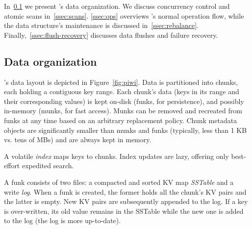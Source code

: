 

In~\cref{ssec:layout} we present \sys's data organization. 
We discuss concurrency control and atomic scans in~\cref{ssec:scans}.
\cref{ssec:ops} overviews \sys's normal %
operation flow, while   the data structure's maintenance is discussed in~\cref{ssec:rebalance}.
Finally,~\cref{ssec:flush-recovery} discusses data flushes and failure recovery.


\subsection{Data organization}
\label{ssec:layout}


\sys's data layout is depicted in Figure~\ref{fig:piwi}.
Data is partitioned into chunks, each holding a contiguous key range.
Each chunk's data 
(keys in its range and their corresponding values) 
is kept on-disk (funks, for persistence), and possibly in-memory (munks, for fast access). 
Munks can be removed and recreated from funks at any time based on an arbitrary replacement policy.
Chunk metadata objects are significantly smaller than munks and funks
(typically, less than 1 KB vs. tens of MBs) and are always kept in memory.

A volatile \emph{index} maps keys to chunks. 
Index updates are lazy, offering only best-effort expedited search.

A funk consists of two files:  a compacted and sorted KV map \emph{SSTable} %
and a write \emph{log}. When a funk is created, the {former} holds all the chunk's KV pairs and the {latter}  is empty.
New KV pairs are subsequently appended to the  {log}. If a key is over-written, its old value remains in the {SSTable} while the new one  is added to the {log} (the {log} is more up-to-date).


